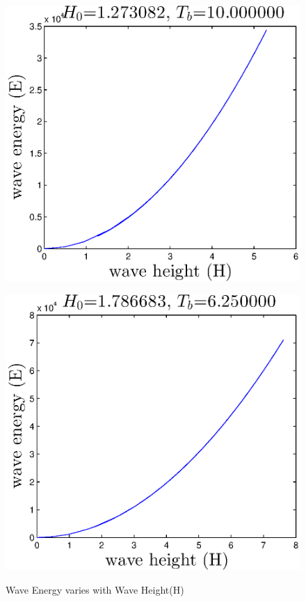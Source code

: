 
\begin{figure}[h]
\begin{minipage}[b]{0.47\linewidth}
\centering
\includegraphics[width=\textwidth]{forward_plot/p1_7.eps}
\label{FigE_1}
\end{minipage}
\hspace{0.4cm}
\begin{minipage}[b]{0.47\linewidth}
\centering
\includegraphics[width=\textwidth]{forward_plot/p2_7.eps}
\label{FigE_2}
\end{minipage}
\caption{Wave Energy varies with Wave Height(H)}
\end{figure}
